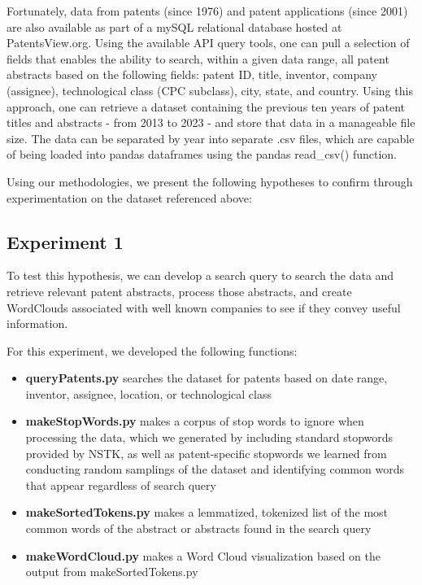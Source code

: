 \documentclass{article}
\begin{document}
Fortunately, data from patents (since 1976) and patent applications (since 2001) are also available as part of a mySQL relational database hosted at PatentsView.org\cite{website:pv1}. Using the available API query tools\cite{website:pv2}, one can pull a selection of fields that enables the ability to search, within a given data range, all patent abstracts based on the following fields: patent ID, title, inventor, company (assignee), technological class (CPC subclass), city, state, and country.  Using this approach, one can retrieve a dataset containing the previous ten years of patent titles and abstracts - from 2013 to 2023 - and store that data in a manageable file size. The data can be separated by year into separate .csv files, which are capable of being loaded into pandas dataframes using the pandas read\_csv() function.

Using our methodologies, we present the following hypotheses to confirm through experimentation on the dataset referenced above:

\subsection{Experiment 1}
\noindent{}

To test this hypothesis, we can develop a search query to search the data and retrieve relevant patent abstracts, process those abstracts, and create WordClouds associated with well known companies to see if they convey useful information.

For this experiment, we developed the following functions:
\begin{itemize}
  \item \textbf{queryPatents.py} searches the dataset for patents based on date range, inventor, assignee, location, or technological class
  \item \textbf{makeStopWords.py} makes a corpus of stop words to ignore when processing the data, which we generated by including standard stopwords provided by NSTK, as well as patent-specific stopwords we learned from conducting random samplings of the dataset and identifying common words that appear regardless of search query
  \item \textbf{makeSortedTokens.py} makes a lemmatized, tokenized list of the most common words of the abstract or abstracts found in the search query
  \item \textbf{makeWordCloud.py} makes a Word Cloud visualization based on the output from makeSortedTokens.py
\end{itemize}
\end{document}
